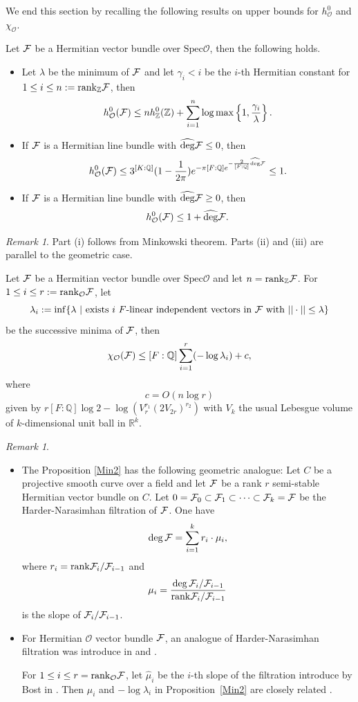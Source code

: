 \documentclass[]{amsart}
\newcommand{\BQ}{{\mathbb {Q}}} \newcommand{\BR}{{\mathbb {R}}}
\newcommand{\CO}{{\mathcal {O}}} \newcommand{\CP}{{\mathcal {P}}}
\newcommand{\Spec}{{\mathrm{Spec}}} \newcommand{\Spf}{{\mathrm{Spf}}}
\newcommand{\wh}{\widehat}
\theoremstyle{plain}
\theoremstyle{remark} \newtheorem{remark}[thm]{Remark}
\theoremstyle{remark} \newtheorem{exercise}{Exercise}
\theoremstyle{remark} \newtheorem{example}{Example}
\numberwithin{equation}{section}
\begin{document}
We end this section by recalling the following results on upper bounds for $h_{\CO}^0$ and $\chi_{\CO}$.
\begin{prop}\label{bd}Let ${\mathcal {F}}$ be a Hermitian vector bundle over $\Spec \CO$, then the following holds. 
  \begin{itemize}
   \item [(i)]\cite[Prop.~5.4]{Groenewegen}Let $\lambda$ be the minimum of ${\mathcal {F}}$ and let $\gamma_i<i$ be the $i$-th Hermitian constant for $1\leq i\leq n:={\mathrm{rank}}_{{\mathbb {Z}}}{\mathcal {F}}$, then \[h_\CO^0(\CF)\leq nh^0_{\BZ}(\BZ)+\sum_{i=1}^{n}\log\max\left\{1,\frac{\gamma_i}{\lambda}\right\}.\]
   \item [(ii)]\cite[Prop.~2.7.1]{Bost:2020}If ${\mathcal {F}}$ is a Hermitian line bundle with $\wh{\deg}\CF\leq 0$, then 
   \[h^0_\CO(\CF)\leq 3^{[K:\BQ]}(1-\frac{1}{2\pi})e^{-\pi[F:\BQ]e^{-\frac{2}{[F:\BQ]}\wh{\deg}\CF}}\leq 1.\]
    \item [(iii)]\cite[Prop.~2.7.2]{Bost:2020} If ${\mathcal {F}}$ is a Hermitian line bundle with $\wh{\deg}\CF\geq 0$, then 
   \[h^0_\CO(\CF)\leq 1+\wh{\deg}\CF.\]
  \end{itemize}
\end{prop} 
\begin{remark}
Part (i) follows from Minkowski theorem. Parts (ii) and (iii) are parallel to the geometric case.
\end{remark}
\begin{prop}\label{Min2}
Let ${\mathcal {F}}$ be a Hermitian vector bundle over $\Spec \CO$ and let $n={\mathrm{rank}}_{{\mathbb {Z}}}{\mathcal {F}}$. For $1\leq i\leq r:=\rank_{\CO}\CF$, let \[\lambda_i:=\inf\{\lambda\ |\ \text{exists $i$ $F$-linear independent vectors in $\CF$ with $||\cdot||\leq \lambda$}\}\] be the successive minima of ${\mathcal {F}}$, then 
\[\chi_{\CO}(\CF)\leq  [F:\BQ]\sum_{i=1}^{r}(-\log\lambda_i)+c,\]where \[c=O(n\log r)\] given by $r[F:\BQ]\log 2-\log (V_{r}^{r_1}(2V_{2r})^{r_2})$ with $V_k$ the usual Lebesgue volume of $k$-dimensional unit ball in $\BR^k$. 
\end{prop}
\begin{remark}\ \label{ns}
\begin{itemize}
  \item [(i)]The Proposition \ref{Min2} has the following geometric analogue: Let $C$ be a projective smooth curve over a field and let ${\mathcal {F}}$ be a rank $r$ semi-stable Hermitian vector bundle on $C$. Let $0={\mathcal {F}}_0\subset {\mathcal {F}}_1\subset \cdots\subset {\mathcal {F}}_k={\mathcal {F}}$ be the Harder-Narasimhan filtration of ${\mathcal {F}}$. 
One have 
\[\deg {\mathcal {F}}=\sum_{i=1}^k r_i\cdot \mu_i,\]where $r_i={\mathrm{rank}} {\mathcal {F}}_{i}/{\mathcal {F}}_{i-1}$ and 
\[\mu_i=\frac{\deg{\mathcal {F}}_{i}/{\mathcal {F}}_{i-1}}{{\mathrm{rank}} {\mathcal {F}}_{i}/{\mathcal {F}}_{i-1}}\] is the slope of ${\mathcal {F}}_{i}/{\mathcal {F}}_{i-1}$.
\item [(ii)] For Hermitian $\CO$ vector bundle ${\mathcal {F}}$, an analogue of Harder-Narasimhan filtration was introduce in \cite{Stuhler} and \cite{Grayson}. 


For $1\leq i\leq r=\rank_{\CO}\CF$, let $\wh{\mu}_i$ be the $i$-th slope of the filtration introduce by Bost in \cite{Bost:1996}. Then $\wh{\mu}_i$ and $-\log\lambda_i$ in Proposition~\ref{Min2} are closely related \cite{Soule:97,Borek}.
\end{itemize}

\end{remark}
\end{document}

